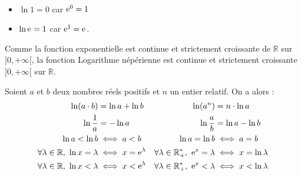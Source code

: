       \begin{rmk}~\\[-1\baselineskip]
            \begin{itemize}
                  \item $\ln 1 = 0$ car $\mathrm{e}^{0} = 1$
                  \item $\ln \mathrm{e}^{} = 1$ car $\mathrm{e}^{1} = \mathrm{e}^{}$.
            \end{itemize}
            Comme la fonction exponentielle est continue et strictement croissante de $\mathbb{R}$ sur $]0,+\infty[$, 
            la fonction Logarithme n\'ep\'erienne est continue et strictement croissante $]0,+\infty[$ sur $\mathbb{R}$.
      \end{rmk}
      \begin{prop}
            Soient $a$ et $b$ deux nombres r\'eels positifs et $n$ un entier relatif.
            On a alors :\\
            \begin{align*}
                        \ln (a\cdot b) & = \ln a + \ln b                                                &       
                        \ln (a^n) & = n \cdot \ln a                                                     \\
                        \ln \frac{1}{a} & = - \ln a                                                     & 
                        \ln \frac{a}{b} & = \ln a - \ln b                                               \\
                        \ln a < \ln b & \iff a < b                                                      & 
                        \ln a = \ln b & \iff a = b                                                      \\
                        \forall \lambda \in \mathbb{R},\ \ln x = \lambda & \iff x = \mathrm{e}^{\lambda}      & 
                        \forall \lambda \in \mathbb{R}^*_+,\ \mathrm{e}^{x} = \lambda & \iff x = \ln{\lambda} \\
                        \forall \lambda \in \mathbb{R},\ \ln x < \lambda & \iff x < \mathrm{e}^{\lambda}      & 
                        \forall \lambda \in \mathbb{R}^*_+,\ \mathrm{e}^{x} < \lambda & \iff x < \ln{\lambda} \\
            \end{align*}
      \end{prop}
